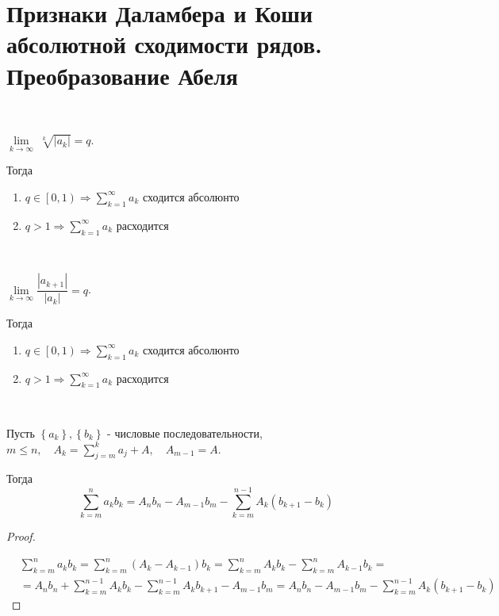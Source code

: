 \documentclass[../main.tex]{subfiles}
\begin{document}
\newpage
\section{Признаки Даламбера и Коши абсолютной сходимости рядов. Преобразование Абеля}

\begin{thm}
    
    ~

    \( \lim\limits_{ k \rightarrow \infty } \;\sqrt[k]{\left| a_k\right|}=q\).

    Тогда
    \begin{enumerate}
        \item \( q \in \left[ 0, 1\right) \Longrightarrow \sum\limits_{ k=1}^{ \infty } a_k\) сходится абсолюнто 
        \item \( q > 1 \Longrightarrow \sum\limits_{ k=1}^{ \infty } a_k\) расходится
    \end{enumerate}
\end{thm}

\begin{thm}
    
    ~

    \( \lim\limits_{ k \rightarrow \infty } \dfrac{ \left| a_{k+1}\right|}{ \left| a_k\right|} =q\).

    Тогда
    \begin{enumerate}
        \item \( q \in \left[ 0, 1\right) \Longrightarrow \sum\limits_{ k=1}^{ \infty } a_k\) сходится абсолюнто 
        \item \( q > 1 \Longrightarrow \sum\limits_{ k=1}^{ \infty } a_k\) расходится
    \end{enumerate}
\end{thm}

\begin{thm}
    
    ~

    Пусть \( \left\{ a_k\right\}, \left\{ b_k\right\}\) - числовые последовательности, \( m \leq n,\quad A_k= \sum\limits_{ j=m}^{ k} a_j+A,\quad A_{m-1}=A\).

    Тогда 
    \[ \sum\limits_{ k=m}^{ n} a_kb_k=A_nb_n-A_{m-1}b_m- \sum\limits_{ k=m}^{ n-1} A_k\left( b_{k+1}-b_k\right)\]
\end{thm}
\begin{proof}
    
    ~

    \begin{equation*}
        \begin{aligned}
            &\sum\limits_{ k=m}^{ n} a_kb_k= \sum\limits_{ k=m}^{ n} \left( A_k-A_{k-1}\right)b_k= \sum\limits_{ k=m}^{ n} A_kb_k- \sum\limits_{ k=m}^{ n} A_{k-1}b_k=\\
            &=A_nb_n+ \sum\limits_{ k=m}^{ n-1} A_kb_k- \sum\limits_{ k=m}^{ n-1} A_kb_{k+1}-A_{m-1}b_m= A_nb_n-A_{m-1}b_m - \sum\limits_{ k=m}^{ n-1} A_k\left( b_{k+1}-b_k\right)
        \end{aligned}
    \end{equation*}
\end{proof}
\end{document}
